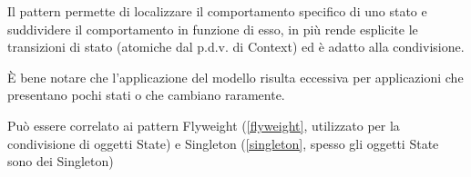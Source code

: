 Il pattern permette di localizzare il comportamento specifico di uno stato e suddividere il comportamento in funzione di esso, in più rende esplicite le transizioni di stato (atomiche dal p.d.v. di Context) ed è adatto alla condivisione.

È bene notare che l'applicazione del modello risulta eccessiva per applicazioni che presentano pochi stati o che cambiano raramente.

Può essere correlato ai pattern Flyweight (\ref{flyweight}, utilizzato per la condivisione di oggetti State) e Singleton (\ref{singleton}, spesso gli oggetti State sono dei Singleton)

\newpage